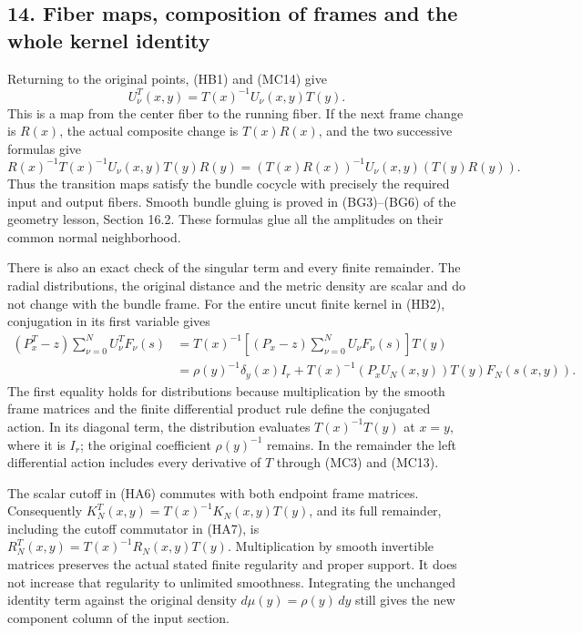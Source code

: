 \documentclass[
  11pt,
]{article}
\begin{document}
\subsection{14. Fiber maps, composition of frames and the whole kernel
identity}\label{fiber-maps-composition-of-frames-and-the-whole-kernel-identity}

Returning to the original points, (HB1) and (MC14) give \[
 U_\nu^{T}(x,y)=T(x)^{-1}U_\nu(x,y)T(y).
 \tag{MC16}
\] This is a map from the center fiber to the running fiber. If the next
frame change is \(R(x)\), the actual composite change is \(T(x)R(x)\),
and the two successive formulas give \[
 R(x)^{-1}T(x)^{-1}U_\nu(x,y)T(y)R(y)
       =(T(x)R(x))^{-1}U_\nu(x,y)(T(y)R(y)).
 \tag{MC17}
\] Thus the transition maps satisfy the bundle cocycle with precisely
the required input and output fibers. Smooth bundle gluing is proved in
(BG3)--(BG6) of the geometry lesson, Section 16.2. These formulas glue
all the amplitudes on their common normal neighborhood.

There is also an exact check of the singular term and every finite
remainder. The radial distributions, the original distance and the
metric density are scalar and do not change with the bundle frame. For
the entire uncut finite kernel in (HB2), conjugation in its first
variable gives \[
\begin{split}
 (P_x^{T}-z)\sum_{\nu=0}^{N}U_\nu^{T}F_\nu(s)
 &=T(x)^{-1}
       \left[(P_x-z)\sum_{\nu=0}^{N}U_\nu F_\nu(s)\right]T(y)\\
 &=\rho(y)^{-1}\delta_y(x)I_r
       +T(x)^{-1}(P_xU_N(x,y))T(y)F_N(s(x,y)).
\end{split}
\tag{MC18}
\] The first equality holds for distributions because multiplication by
the smooth frame matrices and the finite differential product rule
define the conjugated action. In its diagonal term, the distribution
evaluates \(T(x)^{-1}T(y)\) at \(x=y\), where it is \(I_r\); the
original coefficient \(\rho(y)^{-1}\) remains. In the remainder the left
differential action includes every derivative of \(T\) through (MC3) and
(MC13).

The scalar cutoff in (HA6) commutes with both endpoint frame matrices.
Consequently \(K_N^{T}(x,y)=T(x)^{-1}K_N(x,y)T(y)\), and its full
remainder, including the cutoff commutator in (HA7), is
\(R_N^{T}(x,y)=T(x)^{-1}R_N(x,y)T(y)\). Multiplication by smooth
invertible matrices preserves the actual stated finite regularity and
proper support. It does not increase that regularity to unlimited
smoothness. Integrating the unchanged identity term against the original
density \(d\mu(y)=\rho(y)\,dy\) still gives the new component column of
the input section.
\end{document}
